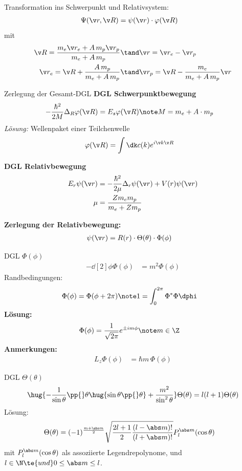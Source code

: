 \documentclass[twocolumn]{summery_4.1}
\begin{document}
Transformation ins Schwerpunkt und Relativsystem:
\begin{align*}
    \Psi(\v r, \v R) &= \psi(\v r)\cdot \varphi(\v R)
\end{align*}
mit 
\begin{align*}
    \v R = \frac{m_e \v r_e + A\, m_p \v r_p}{m_e + A \, m_p}&\tand \v r= \v r_e - \v r_p\\
    \v r_e = \v R + \frac{A\, m_p}{m_e + A\, m_p} &\tand \v r_p = \v R - \frac{m_e}{m_e + A\, m_p} \v r
\end{align*}

{\large Zerlegung der Gesamt-DGL}
{\bf DGL Schwerpunktbewegung}
\begin{align*}
    -\frac{\hbar^2}{2M} \Delta_R \varphi(\v R) &= E_s \varphi(\v R)\note M = m_e +A\cdot m_p
\end{align*}
\textit{Lösung:} Wellenpaket einer Teilchenwelle
\begin{align*}
    \varphi(\v R) &= \int\dk c(k) e^{i\v k \v R}
\end{align*}

{\bf DGL Relativbewegung}
\begin{align*}
    E_r \psi(\v r) &= -\frac{\hbar^2}{2\mu} \Delta_r \psi(\v r) + V(r) \psi(\v r) \\
    \mu &= \frac{Z m_e m_p}{m_e + Z m_p}
\end{align*}

\textbf{Zerlegung der Relativbewegung:}
\begin{align*}
    \psi(\v r) &= R(r) \cdot \Theta(\theta) \cdot \Phi(\phi)
\end{align*}

{\large DGL $\Phi(\phi)$}
\begin{align*}
    - \dd[2]{}\phi \Phi(\phi) &= m^2 \Phi(\phi)
\end{align*}
Randbedingungen:
\begin{align*}
    \Phi(\phi) &= \Phi(\phi+2\pi)\note 1 = \int_0^{2\pi} \Phi^* \Phi \dphi
\end{align*}
\textbf{Lösung:}
\begin{align*}
    \Phi(\phi) &= \frac{1}{\sqrt{2\pi}} e^{\pm i m \phi}\note m\in \Z 
\end{align*}
\textbf{Anmerkungen:}
\begin{align*}
    L_z \Phi(\phi) &= \hbar m\, \Phi(\phi)
\end{align*}

{\large DGL $\Theta(\theta)$}
\begin{align*}
    \hug{-\frac{1}{\sin\theta}\pp{}\theta \hug{\sin\theta\pp{}\theta}  + \frac{m^2}{\sin^2\theta}}\Theta(\theta) =  l(l+1)\Theta(\theta)
\end{align*}
Lösung:
\begin{align*}
    \Theta(\theta) &= (-1)^{\frac{m+\abs m}{2}} \sqrt{\frac{2l +1}{2} \frac{(l - \abs m)!}{(l+\abs m)!}} P_l^{\abs m}(\cos\theta) 
\end{align*}
mit \( P_l^{\abs m}(\cos\theta)\) als assoziierte Legendrepolynome, und \( l\in \N\te{ und } 0 \le \abs m \le l\).\\
\end{document}
